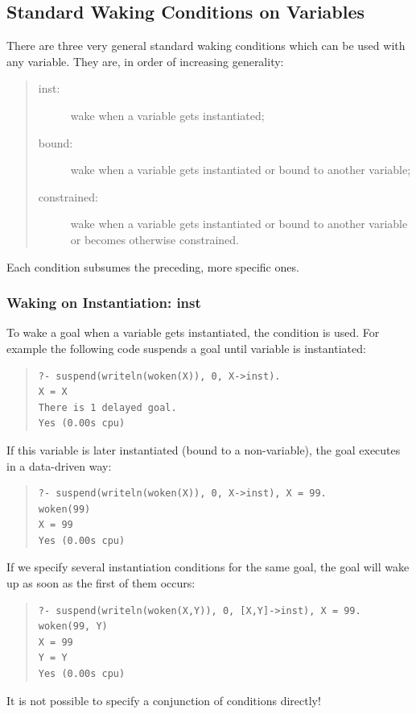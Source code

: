 {%
\subsection{Standard Waking Conditions on Variables}
\label{suspend}
\label{coroutining}%
There are three very general standard waking conditions which
can be used with any variable. They are, in order of increasing generality:
\begin{quote}
\begin{description}
\item[inst:] wake when a variable gets instantiated;
\item[bound:] wake when a variable gets instantiated or bound to
        another variable;
\item[constrained:] wake when a variable gets instantiated or bound to
        another variable or becomes otherwise constrained.
\end{description}
\end{quote}
Each condition subsumes the preceding, more specific ones.


\subsubsection{Waking on Instantiation: inst}

To wake a goal when a variable gets instantiated, the 
condition is used. For example the following code suspends a goal until
variable  is instantiated:
\begin{quote}
\begin{verbatim}
?- suspend(writeln(woken(X)), 0, X->inst).
X = X
There is 1 delayed goal.
Yes (0.00s cpu)
\end{verbatim}
\end{quote}
If this variable is later instantiated (bound to a non-variable),
the goal executes in a data-driven way:
\begin{quote}
\begin{verbatim}
?- suspend(writeln(woken(X)), 0, X->inst), X = 99.
woken(99)
X = 99
Yes (0.00s cpu)
\end{verbatim}
\end{quote}
If we specify several instantiation conditions for the same goal,
the goal will wake up as soon as the first of them occurs:
\begin{quote}
\begin{verbatim}
?- suspend(writeln(woken(X,Y)), 0, [X,Y]->inst), X = 99.
woken(99, Y)
X = 99
Y = Y
Yes (0.00s cpu)
\end{verbatim}
\end{quote}
It is not possible to specify a conjunction of conditions directly!

}

